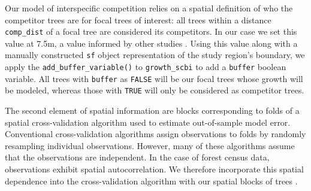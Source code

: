 \documentclass[12pt]{article}
\newenvironment{Shaded}{\begin{snugshade}}{\end{snugshade}}
\newcommand{\CommentTok}[1]{\textcolor[rgb]{0.56,0.35,0.01}{\textit{#1}}}
\newcommand{\DataTypeTok}[1]{\textcolor[rgb]{0.13,0.29,0.53}{#1}}
\newcommand{\DecValTok}[1]{\textcolor[rgb]{0.00,0.00,0.81}{#1}}
\newcommand{\FloatTok}[1]{\textcolor[rgb]{0.00,0.00,0.81}{#1}}
\newcommand{\KeywordTok}[1]{\textcolor[rgb]{0.13,0.29,0.53}{\textbf{#1}}}
\newcommand{\NormalTok}[1]{#1}
\newcommand{\OperatorTok}[1]{\textcolor[rgb]{0.81,0.36,0.00}{\textbf{#1}}}
\newcommand{\StringTok}[1]{\textcolor[rgb]{0.31,0.60,0.02}{#1}}
\begin{document}
Our model of interspecific competition relies on a spatial definition of
who the competitor trees are for focal trees of interest: all trees
within a distance \texttt{comp\_dist} of a focal tree are considered its
competitors. In our case we set this value at 7.5m, a value informed by
other studies \citep[\citet{uriarte_spatially_2004},
\citet{canham_neighborhood_2006}]{canham_neighborhood_2004}. Using this
value along with a manually constructed \texttt{sf} object
representation of the study region's boundary, we apply the
\texttt{add\_buffer\_variable()} to \texttt{growth\_scbi} to add a
\texttt{buffer} boolean variable. All trees with \texttt{buffer} as
\texttt{FALSE} will be our focal trees whose growth will be modeled,
whereas those with \texttt{TRUE} will only be considered as competitor
trees.

\begin{Shaded}
\end{Shaded}

The second element of spatial information are blocks corresponding to
folds of a spatial cross-validation algorithm used to estimate
out-of-sample model error. Conventional cross-validation algorithms
assign observations to folds by randomly resampling individual
observations. However, many of these algorithms assume that the
observations are independent. In the case of forest census data,
observations exhibit spatial autocorrelation. We therefore incorporate
this spatial dependence into the cross-validation algorithm with our
spatial blocks of trees \citep[
\citet{pohjankukka_estimating_2017}]{roberts_cross-validation_2017}.
\end{document}
